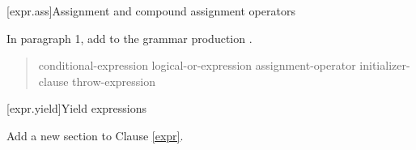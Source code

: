 %	
%

\setcounter{section}{17}
[expr.ass]{Assignment and compound assignment operators}%

In paragraph 1, add  to the grammar production .

\begin{quote}
\begin{bnf}
  \br
  conditional-expression\br
  logical-or-expression assignment-operator initializer-clause\br
  throw-expression \br
\end{bnf}
\end{quote}

\setcounter{section}{20}
[expr.yield]{Yield expressions}%

Add a new section to Clause \ref{expr}.

